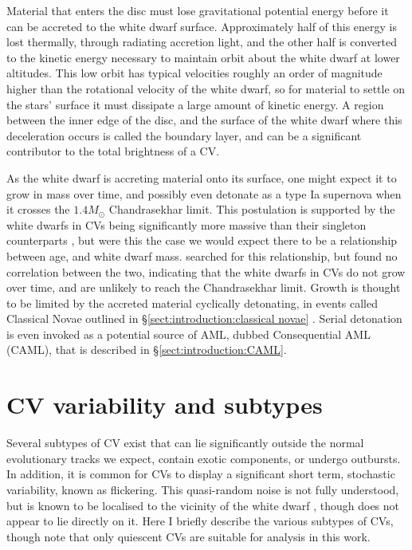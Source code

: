 Material that enters the disc must lose gravitational potential energy before it can be accreted to the white dwarf surface. Approximately half of this energy is lost thermally, through radiating accretion light, and the other half is converted to the kinetic energy necessary to maintain orbit about the white dwarf at lower altitudes. This low orbit has typical velocities roughly an order of magnitude higher than the rotational velocity of the white dwarf, so for material to settle on the stars' surface it must dissipate a large amount of kinetic energy. A region between the inner edge of the disc, and the surface of the white dwarf where this deceleration occurs is called the boundary layer, and can be a significant contributor to the total brightness of a CV.

As the white dwarf is accreting material onto its surface, one might expect it to grow in mass over time, and possibly even detonate as a type Ia supernova when it crosses the $1.4 M_\odot$ Chandrasekhar limit. This postulation is supported by the white dwarfs in CVs being significantly more massive than their singleton counterparts \citep{zorotovic2011}, but were this the case we would expect there to be a relationship between age, and white dwarf mass. \citet{McAllister2019} searched for this relationship, but found no correlation between the two, indicating that the white dwarfs in CVs do not grow over time, and are unlikely to reach the Chandrasekhar limit. Growth is thought to be limited by the accreted material cyclically detonating, in events called Classical Novae outlined in \S\ref{sect:introduction:classical novae} \citep{Wijnen2015,sparks2021}. Serial detonation is even invoked as a potential source of AML, dubbed Consequential AML (CAML), that is described in \S\ref{sect:introduction:CAML}.


\newpage
\section{CV variability and subtypes}
\label{sect:introduction:CV subtypes}
Several subtypes of CV exist that can lie significantly outside the normal evolutionary tracks we expect, contain exotic components, or undergo outbursts.
In addition, it is common for CVs to display a significant short term, stochastic variability, known as flickering. This quasi-random noise is not fully understood, but is known to be localised to the vicinity of the white dwarf \citep{horne1985,bruch1996,bruch2000}, though does not appear to lie directly on it.
Here I briefly describe the various subtypes of CVs, though note that only quiescent CVs are suitable for analysis in this work.

